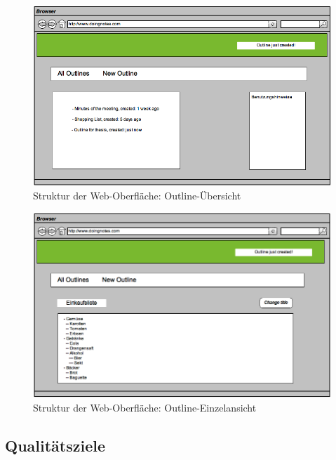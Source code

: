\medskip
\begin{figure}[ht] 
  \begin{center}
  \includegraphics[width=\textwidth]{grafik/user-interface-mockup-list} 
  \end{center}
  \caption{Struktur der Web-Oberfläche: Outline-Übersicht}
  \label{fig:interface-mockup-list} 
\end{figure}

\medskip
\begin{figure}[ht] 
  \begin{center}
  \includegraphics[width=\textwidth]{grafik/user-interface-mockup} 
  \end{center}
  \caption{Struktur der Web-Oberfläche: Outline-Einzelansicht}
  \label{fig:interface-mockup} 
\end{figure}


\subsection{Qualitätsziele}

